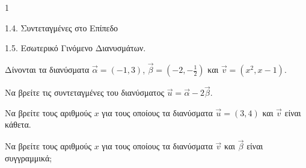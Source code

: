 \begin{ylh}{1}
    \item 1.4. Συντεταγμένες στο Επίπεδο
    \item 1.5. Εσωτερικό Γινόμενο Διανυσμάτων.
\end{ylh}
Δίνονται τα διανύσματα $\vec{α} = (-1,3)$, $\vec{β} = \left(-2, - \frac{1}{2}\right)$ και $\vec{v} = (x^2, x - 1)$.

\begin{alist}
    \item Να βρείτε τις συντεταγμένες του διανύσματος $\vec{u} = \vec{α} - 2\vec{β}$. 
    \item Να βρείτε τους αριθμούς $x$ για τους οποίους τα διανύσματα $\vec{u} = (3,4)$ και $\vec{v}$ είναι κάθετα. 
    \item Να βρείτε τους αριθμούς $x$ για τους οποίους τα διανύσματα $\vec{v}$ και $\vec{β}$ είναι συγγραμμικά; 
\end{alist}